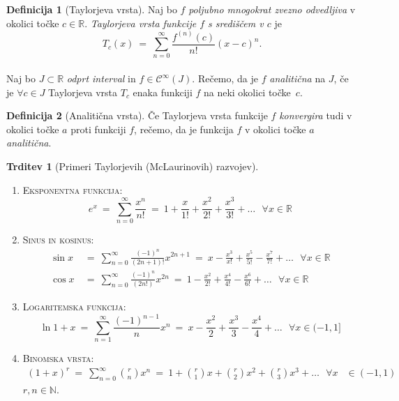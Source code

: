 \documentclass[11pt]{article}
\newcommand{\R}{\mathbb{R}}
\newcommand{\N}{\mathbb{N}}
\theoremstyle{definition}
\newtheorem{definicija}{Definicija}[section]
\theoremstyle{definition}
\newtheorem{trditev}{Trditev}[section]
\theoremstyle{definition}
\theoremstyle{theorem}
\begin{document}
\begin{definicija}[Taylorjeva vrsta]

Naj bo $f$ \textit{poljubno mnogokrat zvezno odvedljiva} v okolici točke $c \in \mathbb{R}$. \textit{Taylorjeva vrsta funkcije $f$ s središčem v $c$} je 
$$T_c(x) ~=~ \sum_{n=0}^{\infty} \frac{f^{(n)}(c)}{n!} (x-c)^n.$$ \\

Naj bo $J \subset \mathbb{R}$ \textit{odprt interval} in $f \in \mathcal{C}^{\infty}(J)$. Rečemo, da je $f$ \textit{analitična} na $J$, če je $\forall c \in J$ Taylorjeva vrsta $T_c$ enaka funkciji $f$ na neki okolici \hbox{točke $c$}.

\end{definicija}
\vspace{0.5cm}

\begin{definicija}[Analitična vrsta]

Če Taylorjeva vrsta funkcije $f$ \textit{konvergira} tudi v okolici točke $a$ proti funkciji $f$, rečemo, da je funkcija $f$ v okolici točke $a$ \textit{analitična}.

\end{definicija}
\vspace{0.5cm}

\begin{trditev}[Primeri Taylorjevih (McLaurinovih) razvojev]
~
\begin{enumerate}
	
	\item \textsc{Eksponentna funkcija}: 
	$$e^x ~=~ \sum_{n=0}^\infty \frac{x^n}{n!} ~=~ 1 + \frac{x}{1!} + \frac{x^2}{2!} + \frac{x^3}{3!} + \ldots ~~~\forall x \in \R$$
	
	\item \textsc{Sinus in kosinus}:
	\begin{align*}
	\sin{x} ~&=~ \sum_{n=0}^\infty \frac{(-1)^n}{(2n+1)!}x^{2n+1} ~=~ x - \frac{x^3}{x!} + \frac{x^5}{5!} - \frac{x^7}{7!} + \ldots ~~~\forall x \in \R \\
	\cos{x} ~&=~ \sum_{n=0}^\infty \frac{(-1)^n}{(2n!)}x^{2n} ~=~ 1 - \frac{x^2}{2!} + \frac{x^4}{4!} - \frac{x^6}{6!} + \ldots ~~~\forall x \in \R
	\end{align*}
	
	\item \textsc{Logaritemska funkcija}:
	$$\ln{1+x} ~=~ \sum_{n=1}^\infty \frac{(-1)^{n-1}}{n}x^n ~=~ x - \frac{x^2}{2} + \frac{x^3}{3} - \frac{x^4}{4} + \ldots ~~~\forall x \in (-1, 1]$$
	
	\item \textsc{Binomska vrsta}:
	\begin{align*}
	(1+x)^r ~=~ \sum_{n=0}^\infty \binom{r}{n}x^n ~=~ 1 + \binom{r}{1}x + \binom{r}{2}x^2 + \binom{r}{3}x^3 + \ldots ~~~ \forall x &\in (-1, 1) 
	\end{align*}	
	$r, n \in \N$.
	
\end{enumerate}

\end{trditev}
\vspace{0.5cm}
\end{document}
